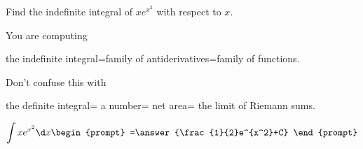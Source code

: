 \documentclass{ximera}
\author{Gregory Hartman \and Matthew Carr\and Nela Lakos}
\begin{document}
\begin{exercise}

Find the indefinite integral of $xe^{x^2}$ with respect to $x$.
\begin{hint}
You are computing 

the indefinite integral=family of antiderivatives=family of functions.

Don't confuse this with

 the definite integral= a number= net area= the limit of Riemann sums. 
\end{hint}
\[
\int xe^{x^2}\d x
\begin{prompt}
=\answer{\frac{1}{2}e^{x^2}+C}
\end{prompt}
\]


\end{exercise}
\end{document}
